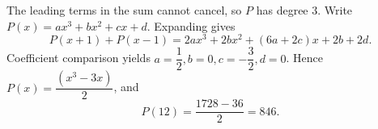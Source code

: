 The leading terms in the sum cannot cancel, so $P$ has degree $3$. Write $P(x)=ax^3+bx^2+cx+d$. Expanding gives
\[
P(x+1)+P(x-1)
=2ax^3+2bx^2+(6a+2c)x+2b+2d.
\]
Coefficient comparison yields $a=\dfrac{1}{2},b=0,c=-\dfrac{3}{2},d=0$. Hence $P(x)=\dfrac{(x^3-3x)}{2}$, and
\[
\boxed{P(12)=\dfrac{1728-36}{2}=846}.
\]
